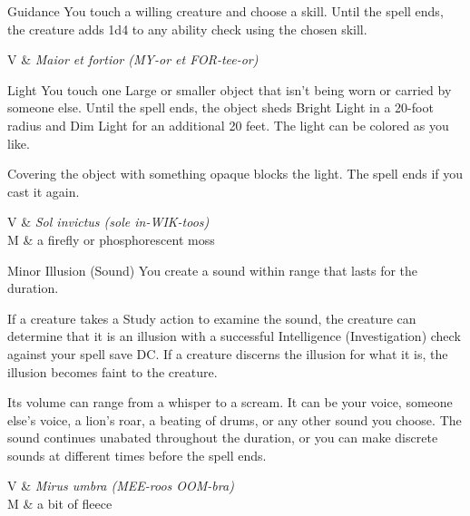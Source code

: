 


\pagestyle{empty}

\begin{Spell}[
    tags=Concentration,
    level=Cantrip,
    time=1 Action,
    range=Touch,
    components={V, S},
    duration=1 Minute,
    school=Divination,
    attack=None,
    effect=Buff
]{Guidance}
You touch a willing creature and choose a skill. Until the spell ends, the creature adds 1d4 to any ability check using the chosen skill.

\begin{components}
V & \textit{Maior et fortior (MY-or et FOR-tee-or)}
\end{components}
\end{Spell}


\begin{Spell}[
    level=Cantrip,
    time=1 Action,
    range=Touch,
    components={V, M},
    duration=1 Hour,
    school=Evocation,
    attack=None,
    effect=Creation
]{Light}
You touch one Large or smaller object that isn't being worn or carried by someone else. Until the spell ends, the object sheds Bright Light in a 20-foot radius and Dim Light for an additional 20 feet. The light can be colored as you like.

Covering the object with something opaque blocks the light. The spell ends if you cast it again.

\begin{components}
V & \textit{Sol invictus (sole in-WIK-toos)} \\
M & a firefly or phosphorescent moss
\end{components}
\end{Spell}


\begin{Spell}[
    level=Cantrip,
    time=1 Action,
    range=30 ft. / 5 ft.,
    components={S, M},
    duration=1 Minute,
    school=Illusion,
    attack=None,
    effect=Control
]{Minor Illusion (Sound)}
You create a sound within range that lasts for the duration.

If a creature takes a Study action to examine the sound, the creature can determine that it is an illusion with a successful Intelligence (Investigation) check against your spell save DC. If a creature discerns the illusion for what it is, the illusion becomes faint to the creature.

Its volume can range from a whisper to a scream. It can be your voice, someone else's voice, a lion's roar, a beating of drums, or any other sound you choose. The sound continues unabated throughout the duration, or you can make discrete sounds at different times before the spell ends.

\begin{components}
V & \textit{Mirus umbra (MEE-roos OOM-bra)} \\
M & a bit of fleece
\end{components}
\end{Spell}


